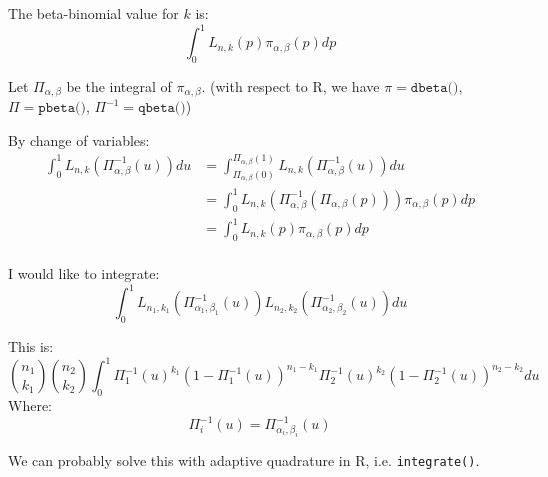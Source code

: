 \documentclass[12pt]{scrartcl}
\begin{document}
The beta-binomial value for $k$ is:
\[\int_0^1 L_{n,k}(p)\pi_{\alpha,\beta}(p)dp\]

Let $\Pi_{\alpha,\beta}$ be the integral of $\pi_{\alpha,\beta}$. (with respect
to R, we have $\pi=\texttt{dbeta()}$, $\Pi=\texttt{pbeta()}$, $\Pi^{-1}=\texttt{qbeta()}$)

By change of variables:
\begin{align*}
  \int_0^1 L_{n,k}(\Pi_{\alpha,\beta}^{-1}(u))du &= \int_{\Pi_{\alpha,\beta}(0)}^{\Pi_{\alpha,\beta}(1)} L_{n,k}(\Pi_{\alpha,\beta}^{-1}(u))du \\
  &= \int_0^1 L_{n,k}(\Pi_{\alpha,\beta}^{-1}(\Pi_{\alpha,\beta}(p)))\pi_{\alpha,\beta}(p)dp \\
  &= \int_0^1 L_{n,k}(p)\pi_{\alpha,\beta}(p)dp \\
\end{align*}

I would like to integrate:
\[\int_0^1 L_{n_1,k_1}(\Pi_{\alpha_1,\beta_1}^{-1}(u))L_{n_2,k_2}(\Pi_{\alpha_2,\beta_2}^{-1}(u))du\]

This is:
\[\binom{n_1}{k_1}\binom{n_2}{k_2}\int_0^1 \Pi_1^{-1}(u)^{k_1}(1-\Pi_1^{-1}(u))^{n_1-k_1} \Pi_2^{-1}(u)^{k_2}(1-\Pi_2^{-1}(u))^{n_2-k_2}du\]
Where:
\[\Pi_i^{-1}(u) = \Pi_{\alpha_i,\beta_i}^{-1}(u)\]

We can probably solve this with adaptive quadrature in R, i.e. \texttt{integrate()}.
\end{document}
